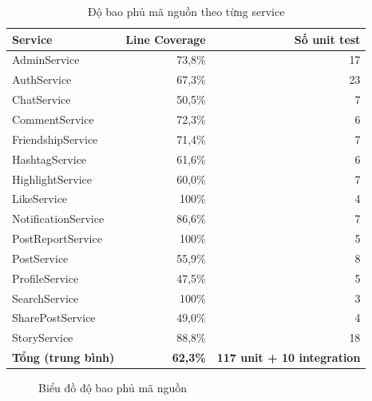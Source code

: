 \documentclass[a4paper]{article}
\begin{document}
\begin{table}[H]
\centering
\begin{tabular}{|l|r|r|}
\hline
\textbf{Service} & \textbf{Line Coverage} & \textbf{Số unit test} \\ \hline
AdminService        & 73,8\% & 17 \\ \hline
AuthService         & 67,3\% & 23 \\ \hline
ChatService         & 50,5\% &  7 \\ \hline
CommentService      & 72,3\% &  6 \\ \hline
FriendshipService   & 71,4\% &  7 \\ \hline
HashtagService      & 61,6\% &  6 \\ \hline
HighlightService    & 60,0\% &  7 \\ \hline
LikeService         & 100\%  &  4 \\ \hline
NotificationService & 86,6\% &  7 \\ \hline
PostReportService   & 100\%  &  5 \\ \hline
PostService         & 55,9\% &  8 \\ \hline
ProfileService      & 47,5\% &  5 \\ \hline
SearchService       & 100\%  &  3 \\ \hline
SharePostService    & 49,0\% &  4 \\ \hline
StoryService        & 88,8\% & 18 \\ \hline
\textbf{Tổng (trung bình)} & \textbf{62,3\%} & \textbf{117 unit + 10 integration} \\ \hline
\end{tabular}
\caption{Độ bao phủ mã nguồn theo từng service}
\end{table}

\begin{figure}[h!]
\begin{center}
\caption{Biểu đồ độ bao phủ mã nguồn}
\end{center}
\end{figure}

\end{document}
